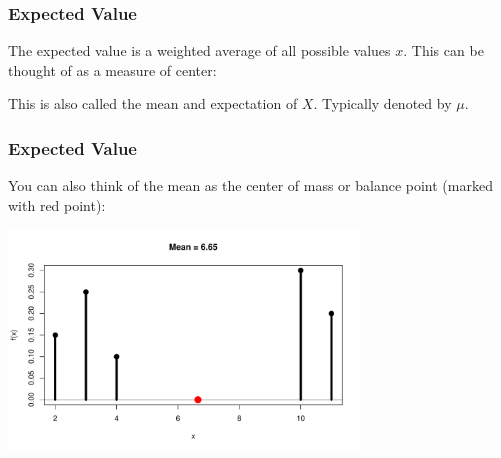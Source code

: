 \documentclass[slides]{beamer}
\newcommand{\blue}[1]{\textcolor{blue2}{#1}}
\newcommand{\prob}{\mbox{Pr}}
\newcommand{\E}{\mathbb{E}}
\begin{document}
\begin{frame}
\frametitle{Expected Value}
The \blue{expected value} is a \blue{weighted average} of all possible values $x$.  This can be thought of as a measure of \blue{center}:
\vspace{4cm}


This is also called the \blue{mean} and \blue{expectation} of $X$.  Typically denoted by $\mu$.

\end{frame}






\begin{frame}
\frametitle{Expected Value}
You can also think of the mean as the \blue{center of mass or balance point} (marked with red point):

\begin{center}
\includegraphics[width=0.7\textwidth]{mean}
\end{center}

\end{frame}
\end{document}
